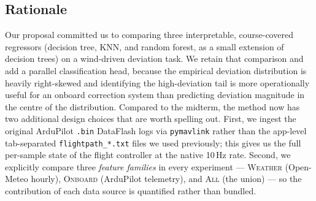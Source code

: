 \documentclass[sigconf, nonacm]{acmart}
\begin{document}
\subsection{Rationale}
Our proposal committed us to comparing three interpretable, course-covered
regressors (decision tree, KNN, and random forest, as a small extension of
decision trees) on a wind-driven deviation task.  We retain that comparison
and add a parallel classification head, because the empirical deviation
distribution is heavily right-skewed and identifying the high-deviation tail
is more operationally useful for an onboard correction system than
predicting deviation magnitude in the centre of the distribution.  Compared
to the midterm, the method now has two additional design choices that are
worth spelling out.  First, we ingest the original ArduPilot \texttt{.bin}
DataFlash logs via \texttt{pymavlink} rather than the app-level
tab-separated \texttt{flightpath\_*.txt} files we used previously; this
gives us the full per-sample state of the flight controller at the native
10\,Hz rate.  Second, we explicitly compare three \emph{feature families}
in every experiment --- \textsc{Weather} (Open-Meteo hourly), \textsc{Onboard}
(ArduPilot telemetry), and \textsc{All} (the union) --- so the contribution
of each data source is quantified rather than bundled.
\end{document}
